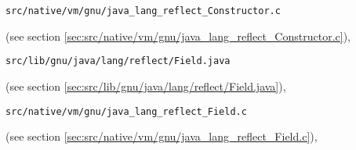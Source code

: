\documentclass[a4paper, 10pt, titlepage]{scrartcl} %
\begin{document}
\begin{scriptsize}\verb|src|\hspace{0.0pt}\verb|/|\hspace{0.0pt}\verb|native|\hspace{0.0pt}\verb|/|\hspace{0.0pt}\verb|vm|\hspace{0.0pt}\verb|/|\hspace{0.0pt}\verb|gnu|\hspace{0.0pt}\verb|/|\hspace{0.0pt}\verb|java_lang_reflect_Constructor|\hspace{0.0pt}\verb|.|\hspace{0.0pt}\verb|c|\end{scriptsize} (see section \ref{sec:src/native/vm/gnu/java_lang_reflect_Constructor.c}),
\begin{scriptsize}\verb|src|\hspace{0.0pt}\verb|/|\hspace{0.0pt}\verb|lib|\hspace{0.0pt}\verb|/|\hspace{0.0pt}\verb|gnu|\hspace{0.0pt}\verb|/|\hspace{0.0pt}\verb|java|\hspace{0.0pt}\verb|/|\hspace{0.0pt}\verb|lang|\hspace{0.0pt}\verb|/|\hspace{0.0pt}\verb|reflect|\hspace{0.0pt}\verb|/|\hspace{0.0pt}\verb|Field|\hspace{0.0pt}\verb|.|\hspace{0.0pt}\verb|java|\end{scriptsize} (see section \ref{sec:src/lib/gnu/java/lang/reflect/Field.java}),
\begin{scriptsize}\verb|src|\hspace{0.0pt}\verb|/|\hspace{0.0pt}\verb|native|\hspace{0.0pt}\verb|/|\hspace{0.0pt}\verb|vm|\hspace{0.0pt}\verb|/|\hspace{0.0pt}\verb|gnu|\hspace{0.0pt}\verb|/|\hspace{0.0pt}\verb|java_lang_reflect_Field|\hspace{0.0pt}\verb|.|\hspace{0.0pt}\verb|c|\end{scriptsize} (see section \ref{sec:src/native/vm/gnu/java_lang_reflect_Field.c}),
\end{document}

